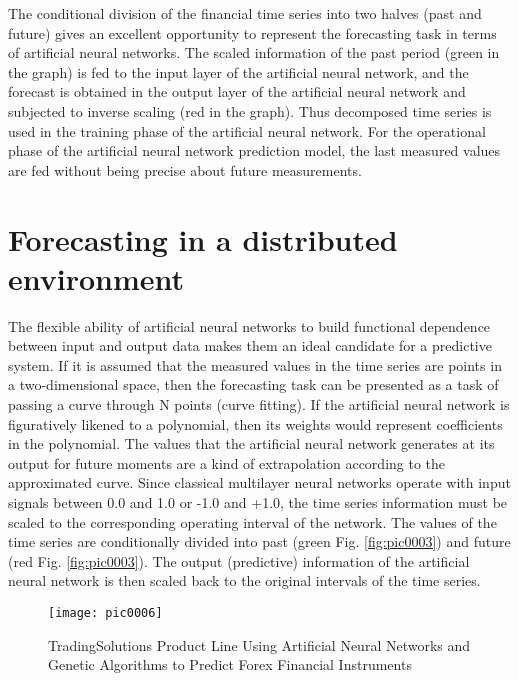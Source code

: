 The conditional division of the financial time series into two halves (past and future) gives an excellent opportunity to represent the forecasting task in terms of artificial neural networks. The scaled information of the past period (green in the graph) is fed to the input layer of the artificial neural network, and the forecast is obtained in the output layer of the artificial neural network and subjected to inverse scaling (red in the graph). Thus decomposed time series is used in the training phase of the artificial neural network. For the operational phase of the artificial neural network prediction model, the last measured values are fed without being precise about future measurements.

\section{Forecasting in a distributed environment}

The flexible ability of artificial neural networks to build functional dependence between input and output data makes them an ideal candidate for a predictive system. If it is assumed that the measured values in the time series are points in a two-dimensional space, then the forecasting task can be presented as a task of passing a curve through N points (curve fitting). If the artificial neural network is figuratively likened to a polynomial, then its weights would represent coefficients in the polynomial. The values that the artificial neural network generates at its output for future moments are a kind of extrapolation according to the approximated curve. Since classical multilayer neural networks operate with input signals between 0.0 and 1.0 or -1.0 and +1.0, the time series information must be scaled to the corresponding operating interval of the network. The values of the time series are conditionally divided into past (green Fig. \ref{fig:pic0003}) and future (red Fig. \ref{fig:pic0003}). The output (predictive) information of the artificial neural network is then scaled back to the original intervals of the time series.

\begin{figure}[h]
\centering
\texttt{[image: pic0006]}
\caption{TradingSolutions Product Line Using Artificial Neural Networks and Genetic Algorithms to Predict Forex Financial Instruments}
\label{fig:pic0006}
\end{figure}

